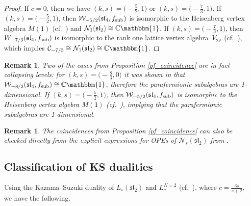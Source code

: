 \documentclass[pdftex]{sigma}
\numberwithin{equation}{section}
\newcommand{\Z}{\mathbb Z}
\newtheorem{Remark}[Theorem]{Remark}
\begin{document}
\begin{proof}
 If $c=0$, then we have $(k,s) = \bigl(-\frac{5}{2}, 1\bigr)$ or $(k,s) = \bigl(-\frac{7}{3}, 1\bigr)$. If $(k,s) = \bigl(-\frac{5}{2}, 1\bigr)$, then $\mathcal W_{-5/2}(\mathfrak{sl}_4, f_{\rm sub})$ is isomorphic to the Heisenberg vertex algebra $M(1)$ (cf.\ \cite{APV}) and $\mathcal N_{1}(\mathfrak{sl}_2) \cong \mathbb{C} \mathbbm{1}$. If $(k,s) = \bigl(-\frac{7}{3}, 1\bigr)$, then $W_{-7/3} (\mathfrak{sl}_4, f_{\rm sub})$ is isomorphic to the rank one lattice vertex algebra~$V_{2 \Z}$ (cf.\ \cite[Theorem~5.5.]{CFLN}), which implies $\mathcal C_{-7/3} \cong \mathcal N_{1}(\mathfrak{sl}_2) \cong \mathbb{C} \mathbbm{1}$.
\end{proof}

\begin{Remark}
	Two of the cases from Proposition \ref{pf_coincidence} are in fact collapsing levels: for $(k,s) = \bigl(-\frac{8}{3},0\bigr)$ it was shown in \cite{AMP-IMRN} that $\mathcal W_{-8/3}(\mathfrak{sl}_4, f_{\rm sub}) \cong \mathbb{C}\mathbbm{1}$, therefore the parafermionic subalgebras are 1-dimensional.
 If $(k,s) = \bigl(-\frac{5}{2}, 1\bigr)$, then $\mathcal W_{-5/2}(\mathfrak{sl}_4, f_{\rm sub})$ is isomorphic to the Heisenberg vertex algebra $M(1)$ (cf.\ \cite{APV}), implying that the parafermionic subalgebras are 1-dimensional.
\end{Remark}

\begin{Remark}
	The coincidences from Proposition \ref{pf_coincidence} can also be checked directly from the explicit expressions for OPEs of $\mathcal N_s(\mathfrak{sl}_2)$ from \cite{DLY}.
\end{Remark}

\subsection{Classification of KS dualities}

Using the Kazama--Suzuki duality of $L_s(\mathfrak{sl}_2)$ and $L^{N=2}_c$ (cf.\ \cite{A-IMRN}), where $c =\frac{3s}{s+2}$, we have the following.
\end{document}
